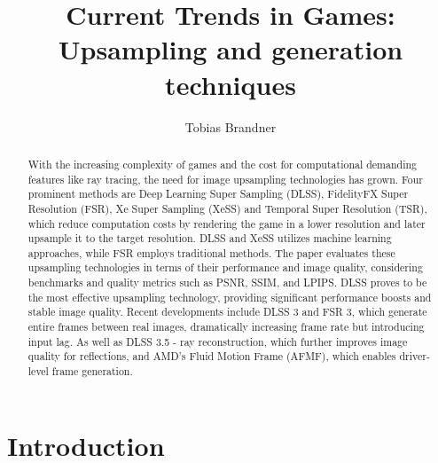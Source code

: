 \documentclass[letterpaper, 10 pt, conference]{ieeeconf}  %
\title{\LARGE \bf
Current Trends in Games: Upsampling and generation techniques
}
\author{Tobias Brandner}
\affil{Julius-Maximilians University \\
        Würzburg, Germany \\
        tobias.brandner@stud-mail.uni-wuerzburg.de}
\begin{document}
\maketitle
\thispagestyle{empty}
\pagestyle{empty}

\BiblatexSplitbibDefernumbersWarningOff

\begin{abstract}

With the increasing complexity of games and the cost for computational demanding features like ray tracing, the need for image upsampling technologies has grown. 
Four prominent methods are Deep Learning Super Sampling (DLSS), FidelityFX Super Resolution (FSR), Xe Super Sampling (XeSS) and Temporal Super Resolution (TSR), which reduce computation costs by rendering the game in a lower resolution and later upsample it to the target resolution. 
DLSS and XeSS utilizes machine learning approaches, while FSR employs traditional methods. 
The paper evaluates these upsampling technologies in terms of their performance and image quality, considering benchmarks and quality metrics such as PSNR, SSIM, and LPIPS. 
DLSS proves to be the most effective upsampling technology, providing significant performance boosts and stable image quality. 
Recent developments include DLSS 3 and FSR 3, which generate entire frames between real images, dramatically increasing frame rate but introducing input lag.
As well as DLSS 3.5 - ray reconstruction, which further improves image quality for reflections, and AMD's Fluid Motion Frame (AFMF), which enables driver-level frame generation.

\end{abstract}


\section{Introduction}
\end{document}
